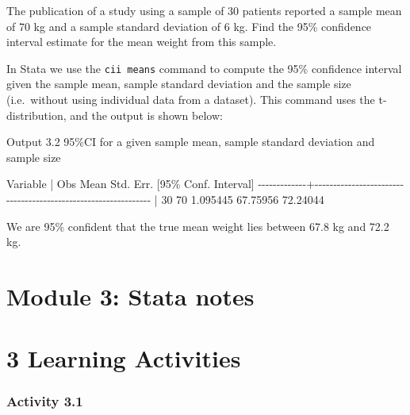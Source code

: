 \documentclass[
]{memoir}
\newenvironment{Shaded}{\begin{snugshade}}{\end{snugshade}}
\newcommand{\NormalTok}[1]{#1}
\begin{document}
The publication of a study using a sample of 30 patients reported a sample mean of 70 kg and a sample standard deviation of 6 kg. Find the 95\% confidence interval estimate for the mean weight from this sample.

In Stata we use the \texttt{cii\ means} command to compute the 95\% confidence interval given the sample mean, sample standard deviation and the sample size (i.e.~without using individual data from a dataset). This command uses the t-distribution, and the output is shown below:

Output 3.2 95\%CI for a given sample mean, sample standard deviation and sample size

\begin{Shaded}
\begin{Highlighting}[]
\NormalTok{    Variable |        Obs        Mean    Std. Err.       [95\% Conf. Interval]}
\NormalTok{{-}{-}{-}{-}{-}{-}{-}{-}{-}{-}{-}{-}{-}+{-}{-}{-}{-}{-}{-}{-}{-}{-}{-}{-}{-}{-}{-}{-}{-}{-}{-}{-}{-}{-}{-}{-}{-}{-}{-}{-}{-}{-}{-}{-}{-}{-}{-}{-}{-}{-}{-}{-}{-}{-}{-}{-}{-}{-}{-}{-}{-}{-}{-}{-}{-}{-}{-}{-}{-}{-}{-}{-}{-}{-}{-}{-}}
\NormalTok{             |         30          70    1.095445        67.75956    72.24044}
\end{Highlighting}
\end{Shaded}

We are 95\% confident that the true mean weight lies between 67.8 kg and 72.2 kg.

\hypertarget{module-3-stata-notes}{%
\chapter*{Module 3: Stata notes}\label{module-3-stata-notes}}

\hypertarget{learning-activities-2}{%
\chapter*{\texorpdfstring{\textbf{3} Learning Activities}{3 Learning Activities}}\label{learning-activities-2}}

\hypertarget{activity-3.1}{%
\subsection*{Activity 3.1}\label{activity-3.1}}
\end{document}
